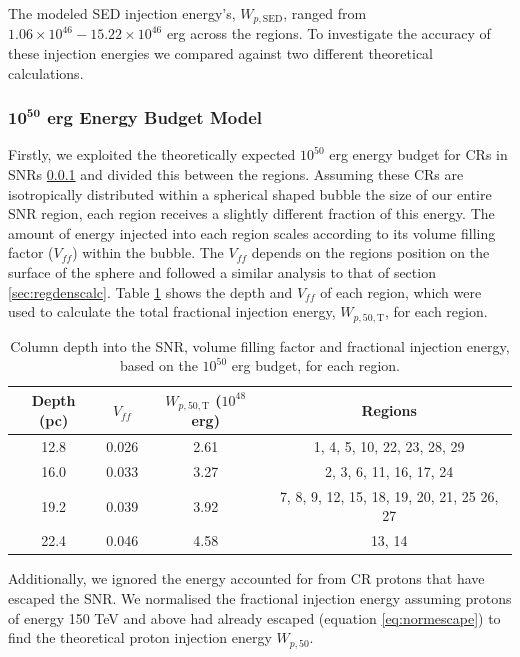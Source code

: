 \documentclass[12pt,a4paper]{article}
\begin{document}
The modeled SED injection energy's, $W_{p,\mathrm{SED}}$, ranged from $1.06 \times 10^{46} - 15.22 \times 10^{46}$ erg across the regions. 
To investigate the accuracy of these injection energies we compared against two different theoretical calculations. 

\subsubsection{$\mathbf{10^{50}}$ erg Energy Budget Model}
Firstly, we exploited the theoretically expected $10^{50}$ erg energy budget for CRs in SNRs \ref{} and divided this between the regions. 
Assuming these CRs are isotropically distributed within a spherical shaped bubble the size of our entire SNR region, each region receives a slightly different fraction of this energy. The amount of energy injected into each region scales according to its volume filling factor ($V_{ff}$) within the bubble. The $V_{ff}$ depends on the regions position on the surface of the sphere and followed a similar analysis to that of section \ref{sec:regdenscalc}. Table \ref{tab:regionalvolumes} shows the depth and $V_{ff}$ of each region, which were used to calculate the total fractional injection energy, $W_{p,50,\mathrm{T}}$, for each region. 
\begin{table}[H] 
	\begin{center}
		\begin{tabular}{cccc}
			\toprule
			Depth (pc) & $V_{ff}$ &  $W_{p,50,\mathrm{T}}$ ($10^{48}$erg) & Regions \\
			\hline
			12.8 & 0.026 & 2.61 & 1, 4, 5, 10, 22, 23, 28, 29 \\
			16.0 & 0.033 & 3.27 & 2, 3, 6, 11, 16, 17, 24 \\
			19.2 & 0.039 & 3.92 & 7, 8, 9, 12, 15, 18, 19, 20, 21, 25 26, 27 \\
			22.4 & 0.046 & 4.58 & 13, 14 \\
			\bottomrule
		\end{tabular} 
	\end{center}
	\caption{Column depth into the SNR, volume filling factor and fractional injection energy, based on the $10^{50}$ erg budget, for each region.}
	\label{tab:regionalvolumes}
\end{table}
Additionally, we ignored the energy accounted for from CR protons that have escaped the SNR. We normalised the fractional injection energy assuming protons of energy 150 TeV and above had already escaped (equation \ref{eq:normescape}) to find the theoretical proton injection energy $W_{p,50}$. 
\end{document}
